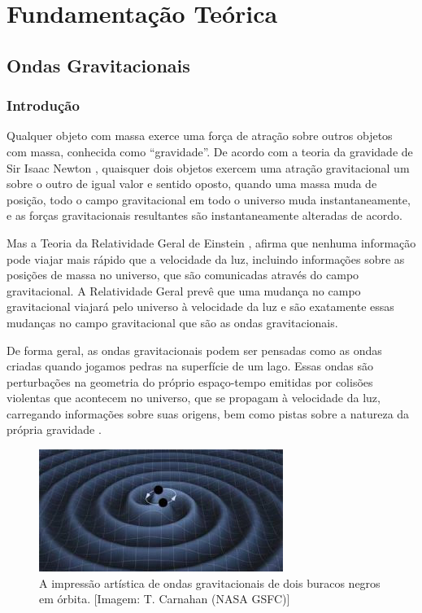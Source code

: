 \chapter{Fundamentação Teórica}
\section{Ondas Gravitacionais}
\subsection{Introdução}

Qualquer objeto com massa exerce uma força de atração sobre outros objetos com massa, conhecida como “gravidade”. De acordo com a teoria da gravidade de Sir Isaac Newton \cite{newton1687philosophiae}, quaisquer dois objetos exercem uma atração gravitacional um sobre o outro de igual valor e sentido oposto, quando uma massa muda de posição, todo o campo gravitacional em todo o universo muda instantaneamente, e as forças gravitacionais resultantes são instantaneamente alteradas de acordo.

Mas a Teoria da Relatividade Geral de Einstein \cite{albert1920realtivity}, afirma que nenhuma informação pode viajar mais rápido que a velocidade da luz, incluindo informações sobre as posições de massa no universo, que são comunicadas através do campo gravitacional. A Relatividade Geral prevê que uma mudança no campo gravitacional viajará pelo universo à velocidade da luz e são exatamente essas mudanças no campo gravitacional que são as ondas gravitacionais.

De forma geral, as ondas gravitacionais podem ser pensadas como as ondas criadas quando jogamos pedras na superfície de um lago. Essas ondas são perturbações na geometria do próprio espaço-tempo emitidas por colisões violentas que acontecem no universo, que se propagam à velocidade da luz, carregando informações sobre suas origens, bem como pistas sobre a natureza da própria gravidade \cite{LSC-VIRGO, abbott2016observation, ramos2018teoria}.

\begin{figure}[ht]
\centering
\includegraphics[width=.9\textwidth]{figuras/binary-wave_tn.jpg}
\caption{A impressão artística de ondas gravitacionais de dois buracos negros em órbita. [Imagem: T. Carnahan (NASA GSFC)]}
\label{fig:space-time}
\end{figure}


